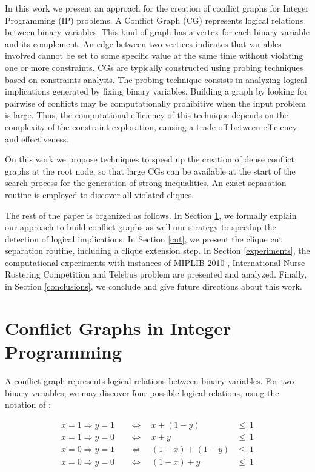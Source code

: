 \documentclass{endm}
\begin{document}
In this work we present an approach for the creation of conflict graphs for Integer Programming (IP) problems. A Conflict Graph (CG) represents logical relations between binary variables. This kind of graph has a vertex for each binary variable and its complement. An edge between two vertices indicates that variables involved cannot be set to some specific value at the same time without violating one or more constraints. CGs are typically constructed using probing techniques \cite{Borndorfer1998} based on constraints analysis. The probing technique consists in analyzing logical implications generated by fixing binary variables.  Building a graph by looking for pairwise of conflicts may be computationally prohibitive when the input problem is large. Thus, the computational efficiency of this technique depends on the complexity of the constraint exploration, causing a trade off between efficiency and effectiveness. 

On this work we propose techniques to speed up the creation of dense conflict graphs at the root node, so that large CGs can be available at the start of the search process for the generation of strong inequalities. An exact separation routine is employed to discover all violated cliques. 

The rest of the paper is organized as follows. In Section \ref{seccgraph}, we formally explain our approach to build conflict graphs as well our strategy to speedup the detection of logical implications. In Section \ref{cut}, we present the clique cut separation routine, including a clique extension step. In Section \ref{experiments}, the computational experiments with instances of MIPLIB 2010 \cite{miplib}, International Nurse Rostering Competition \cite{haspeslagh} and Telebus problem \cite{Borndorfer1998} are presented and analyzed. Finally, in Section \ref{conclusions}, we conclude and give future directions about this work.

\section{Conflict Graphs in Integer Programming}\label{seccgraph}

A conflict graph represents logical relations between binary variables. For two binary variables, we may discover four possible logical relations, using the notation of \cite{atamturk}:


\begin{align}
x = 1 \Rightarrow y = 1 & \quad \Longleftrightarrow \quad x + (1 - y) & \leq \ 1\\
x = 1 \Rightarrow y = 0 & \quad \Longleftrightarrow \quad x + y & \leq \ 1 \\
x = 0 \Rightarrow y = 1 & \quad \Longleftrightarrow \quad (1 - x) + (1 - y) & \leq \ 1 \\
x = 0 \Rightarrow y = 0 & \quad \Longleftrightarrow \quad (1 - x) + y & \leq \ 1
\end{align}
\end{document}

